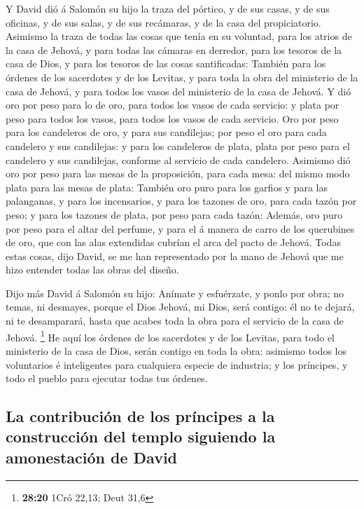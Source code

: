  Y David dió á Salomón su hijo la traza del pórtico, y de
sus casas, y de sus oficinas, y de sus salas, y de sus recámaras, y de
la casa del propiciatorio.  Asimismo la traza de todas las
cosas que tenía en su voluntad, para los atrios de la casa de Jehová, y
para todas las cámaras en derredor, para los tesoros de la casa de Dios,
y para los tesoros de las cosas santificadas:  También para
los órdenes de los sacerdotes y de los Levitas, y para toda la obra del
ministerio de la casa de Jehová, y para todos los vasos del ministerio
de la casa de Jehová.  Y dió oro por peso para lo de oro,
para todos los vasos de cada servicio: y plata por peso para todos los
vasos, para todos los vasos de cada servicio.  Oro por peso
para los candeleros de oro, y para sus candilejas; por peso el oro para
cada candelero y sus candilejas: y para los candeleros de plata, plata
por peso para el candelero y sus candilejas, conforme al servicio de
cada candelero.  Asimismo dió oro por peso para las mesas
de la proposición, para cada mesa: del mismo modo plata para las mesas
de plata:  También oro puro para los garfios y para las
palanganas, y para los incensarios, y para los tazones de oro, para cada
tazón por peso; y para los tazones de plata, por peso para cada tazón:
 Además, oro puro por peso para el altar del perfume, y
para el á manera de carro de los querubines de oro, que con las alas
extendidas cubrían el arca del pacto de Jehová.  Todas
estas cosas, dijo David, se me han representado por la mano de Jehová
que me hizo entender todas las obras del diseño.

 Dijo más David á Salomón su hijo: Anímate y esfuérzate, y
ponlo por obra; no temas, ni desmayes, porque el Dios Jehová, mi Dios,
será contigo: él no te dejará, ni te desamparará, hasta que acabes toda
la obra para el servicio de la casa de Jehová. \footnote{\textbf{28:20}
  1Cró 22,13; Deut 31,6}  He aquí los órdenes de los
sacerdotes y de los Levitas, para todo el ministerio de la casa de Dios,
serán contigo en toda la obra: asimismo todos los voluntarios é
inteligentes para cualquiera especie de industria; y los príncipes, y
todo el pueblo para ejecutar todas tus órdenes.

\hypertarget{la-contribuciuxf3n-de-los-pruxedncipes-a-la-construcciuxf3n-del-templo-siguiendo-la-amonestaciuxf3n-de-david}{%
\subsection{La contribución de los príncipes a la construcción del
templo siguiendo la amonestación de
David}\label{la-contribuciuxf3n-de-los-pruxedncipes-a-la-construcciuxf3n-del-templo-siguiendo-la-amonestaciuxf3n-de-david}}

